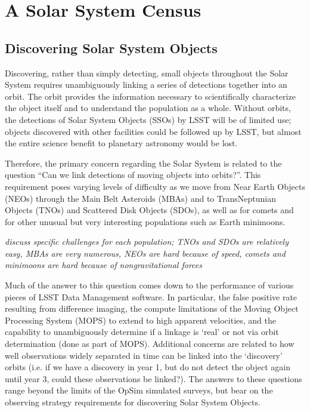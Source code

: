 \chapter[Solar System]{A Solar System Census}
\label{chp:solarsystem}


\section{Discovering Solar System Objects}

Discovering, rather than simply detecting, small objects throughout
the Solar System requires unambiguously linking a series of detections
together into an orbit. The orbit provides the information necessary
to scientifically characterize the object itself and to understand the
population as a whole. Without orbits, the detections of Solar System
Objects (SSOs) by LSST will be of limited use; objects discovered with
other facilities could be followed up by LSST, but almost the entire
science benefit to planetary astronomy would be lost. 

Therefore, the primary concern regarding the Solar System is related
to the question ``Can we link detections of moving objects into
orbits?''.  This requirement poses varying levels of difficulty as we
move from Near Earth Objects (NEOs) through the Main Belt Asteroids
(MBAs) and to TransNeptunian Objects (TNOs) and Scattered Disk Objects
(SDOs), as well as for comets and for other unusual but very
interesting populations such as Earth minimoons. 

{\it discuss specific challenges for each population; TNOs and SDOs are
  relatively easy, MBAs are very numerous, NEOs are hard because of
  speed, comets and minimoons are hard because of nongravitational forces}

Much of the answer to this question comes down to the performance of
various pieces of LSST Data Management software. In particular, the
false positive rate resulting from difference imaging, the compute
limitations of the Moving Object Processing System (MOPS) to extend to high
apparent velocities, and the capability to unambiguously determine if
a linkage is `real' or not via orbit determination (done as part of
MOPS). Additional concerns are related to how well observations
widely separated in time can be linked into the `discovery' orbits
(i.e. if we have a discovery in year 1, but do not detect the object
again until year 3, could these observations be linked?). The answers
to these questions range beyond the limits of the OpSim simulated
surveys, but bear on the observing strategy requirements for
discovering Solar System Objects.

